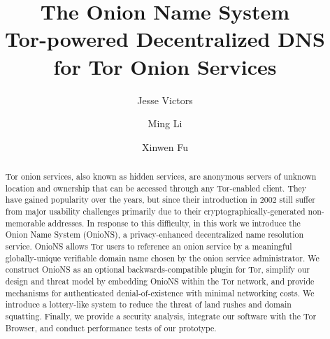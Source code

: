 \documentclass[USenglish,oneside,twocolumn]{article}
\begin{document}
\title{\huge The Onion Name System \large \\ Tor-powered Decentralized DNS for Tor Onion Services}

\author[1]{Jesse Victors}
\author[2]{Ming Li}
\author[3]{Xinwen Fu}

\begin{abstract} {
Tor onion services, also known as hidden services, are anonymous servers of unknown location and ownership that can be accessed through any Tor-enabled client. They have gained popularity over the years, but since their introduction in 2002 still suffer from major usability challenges primarily due to their cryptographically-generated non-memorable addresses. \newline \hspace*{1em} In response to this difficulty, in this work we introduce the Onion Name System (OnioNS), a privacy-enhanced decentralized name resolution service. OnioNS allows Tor users to reference an onion service by a meaningful globally-unique verifiable domain name chosen by the onion service administrator. We construct OnioNS as an optional backwards-compatible plugin for Tor, simplify our design and threat model by embedding OnioNS within the Tor network, and provide mechanisms for authenticated denial-of-existence with minimal networking costs. We introduce a lottery-like system to reduce the threat of land rushes and domain squatting. Finally, we provide a security analysis, integrate our software with the Tor Browser, and conduct performance tests of our prototype.
}
\end{abstract}
  
\end{document}
